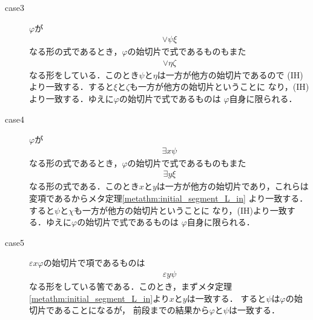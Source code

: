 \begin{metaprf}
\begin{description}
\begin{description}
					\item[case3] $\varphi$が
						\begin{align}
							\vee \psi \xi
						\end{align}
						なる形の式であるとき，$\varphi$の始切片で式であるものもまた
						\begin{align}
							\vee \eta \zeta
						\end{align}
						なる形をしている．このとき$\psi$と$\eta$は一方が他方の始切片であるので
						(IH)より一致する．すると$\xi$と$\zeta$も一方が他方の始切片ということに
						なり，(IH)より一致する．ゆえに$\varphi$の始切片で式であるものは
						$\varphi$自身に限られる．
						
					\item[case4] $\varphi$が
						\begin{align}
							\exists x \psi
						\end{align}
						なる形の式であるとき，$\varphi$の始切片で式であるものもまた
						\begin{align}
							\exists y \xi
						\end{align}
						なる形の式である．このとき$x$と$y$は一方が他方の始切片であり，これらは
						変項であるからメタ定理\ref{metathm:initial_segment_L_in}
						より一致する．すると$\psi$と$\chi$も一方が他方の始切片ということに
						なり，(IH)より一致する．ゆえに$\varphi$の始切片で式であるものは
						$\varphi$自身に限られる．
						
					\item[case5] $\varepsilon x \varphi$の始切片で項であるものは
						\begin{align}
							\varepsilon y \psi
						\end{align}
						なる形をしている筈である．このとき，まずメタ定理
						\ref{metathm:initial_segment_L_in}より$x$と$y$は一致する．
						すると$\psi$は$\varphi$の始切片であることになるが，
						前段までの結果から$\varphi$と$\psi$は一致する．
						\QED
				\end{description}
		\end{description}
	\end{metaprf}
	
